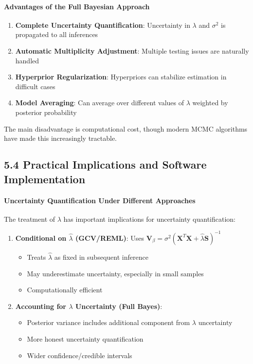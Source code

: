 \documentclass[11pt, a4paper]{article}
\begin{document}
\paragraph{Advantages of the Full Bayesian Approach}
\begin{enumerate}
\item \textbf{Complete Uncertainty Quantification}: Uncertainty in $\lambda$ and $\sigma^2$ is propagated to all inferences
\item \textbf{Automatic Multiplicity Adjustment}: Multiple testing issues are naturally handled
\item \textbf{Hyperprior Regularization}: Hyperpriors can stabilize estimation in difficult cases
\item \textbf{Model Averaging}: Can average over different values of $\lambda$ weighted by posterior probability
\end{enumerate}

The main disadvantage is computational cost, though modern MCMC algorithms have made this increasingly tractable.

\subsection{5.4 Practical Implications and Software Implementation}

\paragraph{Uncertainty Quantification Under Different Approaches}
The treatment of $\lambda$ has important implications for uncertainty quantification:

\begin{enumerate}
\item \textbf{Conditional on $\hat{\lambda}$ (GCV/REML)}: Uses $\mathbf{V}_{\beta} = \sigma^2(\mathbf{X}^T\mathbf{X} + \hat{\lambda}\mathbf{S})^{-1}$
   \begin{itemize}
   \item Treats $\hat{\lambda}$ as fixed in subsequent inference
   \item May underestimate uncertainty, especially in small samples
   \item Computationally efficient
   \end{itemize}

\item \textbf{Accounting for $\lambda$ Uncertainty (Full Bayes)}: 
   \begin{itemize}
   \item Posterior variance includes additional component from $\lambda$ uncertainty
   \item More honest uncertainty quantification
   \item Wider confidence/credible intervals
   \end{itemize}
\end{enumerate}
\end{document}
